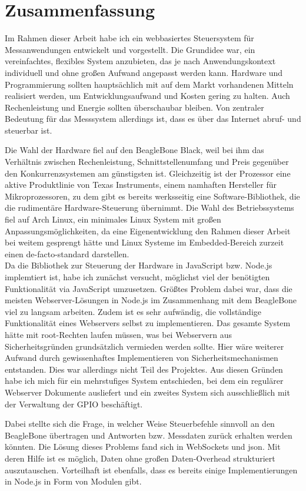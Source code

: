 \chapter{Zusammenfassung}
Im Rahmen dieser Arbeit habe ich ein webbasiertes Steuersystem für Messanwendungen entwickelt und vorgestellt. Die Grundidee war, ein vereinfachtes, flexibles System anzubieten, das je nach Anwendungskontext individuell und ohne großen Aufwand angepasst werden kann. Hardware und Programmierung sollten hauptsächlich mit auf dem Markt vorhandenen Mitteln realisiert werden, um Entwicklungsaufwand und Kosten gering zu halten. Auch Rechenleistung und Energie sollten überschaubar bleiben. Von zentraler Bedeutung für das Messsystem allerdings ist, dass es über das Internet abruf- und steuerbar ist.

Die Wahl der Hardware fiel auf den BeagleBone Black, weil bei ihm das Verhältnis zwischen Rechenleistung, Schnittstellenumfang und Preis gegenüber den Konkurrenzsystemen am günstigsten ist. Gleichzeitig ist der Prozessor eine aktive Produktlinie von Texas Instruments, einem namhaften Hersteller für Mikroprozessoren, zu dem gibt es bereits werksseitig eine Software-Bibliothek, die die rudimentäre Hardware-Steuerung übernimmt. Die Wahl des Betriebssystems fiel auf Arch Linux, ein minimales Linux System mit großen Anpassungsmöglichkeiten, da eine Eigenentwicklung den Rahmen dieser Arbeit bei weitem gesprengt hätte und Linux Systeme im Embedded-Bereich zurzeit einen \gls{de-facto-standard} darstellen.\\

Da die Bibliothek zur Steuerung der Hardware in JavaScript bzw. Node.js implemtiert ist, habe ich zunächst versucht, möglichst viel der benötigten Funktionalität via JavaScript umzusetzen. Größtes Problem dabei war, dass die meisten Webserver-Lösungen in Node.js im Zusammenhang mit dem BeagleBone viel zu langsam arbeiten. Zudem ist es sehr aufwändig,  die vollständige Funktionalität eines Webservers selbst zu implementieren. Das gesamte System hätte mit root-Rechten laufen müssen, was bei Webservern aus Sicherheitsgründen grundsätzlich vermieden werden sollte. Hier wäre weiterer Aufwand durch gewissenhaftes Implementieren von Sicherheitsmechanismen entstanden. Dies war allerdings nicht Teil des Projektes. Aus diesen Gründen habe ich mich für ein mehrstufiges System entschieden, bei dem ein regulärer Webserver Dokumente ausliefert und ein zweites System sich ausschließlich mit der Verwaltung der GPIO beschäftigt.

Dabei stellte sich die Frage, in welcher Weise Steuerbefehle sinnvoll an den BeagleBone übertragen und Antworten bzw. Messdaten zurück erhalten werden könnten. Die Lösung dieses Problems fand sich in WebSockets und \gls{json}. Mit deren Hilfe ist es möglich, Daten ohne großen Daten-Overhead strukturiert auszutauschen. Vorteilhaft ist ebenfalls, dass es bereits einige Implementierungen in Node.js in Form von Modulen gibt.\\

